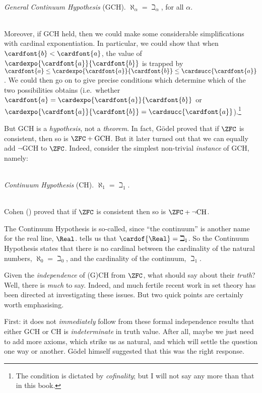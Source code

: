 \documentclass[../../../include/open-logic-section]{subfiles}
\begin{document}
\
\\\emph{General Continuum Hypothesis} (GCH). $\aleph_\alpha  = \beth_\alpha$, for all $\alpha$. 

\
\\Moreover, if GCH held, then we could make some considerable simplifications with cardinal exponentiation. In particular, we could show that when $\cardfont{b} < \cardfont{a}$, the value of $\cardexpo{\cardfont{a}}{\cardfont{b}}$ is trapped by $\cardfont{a}\leq \cardexpo{\cardfont{a}}{\cardfont{b}} \leq \cardsucc{\cardfont{a}}$. We could then go on to give precise conditions which determine which of the two possibilities obtains (i.e.\ whether $\cardfont{a} = \cardexpo{\cardfont{a}}{\cardfont{b}}$ or $\cardexpo{\cardfont{a}}{\cardfont{b}} = \cardsucc{\cardfont{a}}$).\footnote{The condition is dictated by \emph{cofinality}; but I will not say any more than that in this book.}

But GCH is a \emph{hypothesis}, not a \emph{theorem}. In fact, G\"odel \citeyear{Godel1938} proved that if $\ZFC$ is consistent, then so is $\ZFC + \text{GCH}$. But it later turned out that we can equally add $\lnot$GCH to $\ZFC$. Indeed, consider the simplest non-trivial \emph{instance} of GCH, namely: 

\
\\\emph{Continuum Hypothesis} (CH). $\aleph_1 = \beth_1$. 

\
\\
Cohen (\citeyear{Cohen1963}) proved that if $\ZFC$ is consistent then so is $\ZFC + \lnot\text{CH}$. 

The Continuum Hypothesis is so-called, since ``the continuum'' is another name for the real line, $\Real$.   tells us that $\cardof{\Real} = \beth_1$. So the Continuum Hypothesis states that there is no cardinal between the cardinality of the natural numbers, $\aleph_0 = \beth_0$, and the cardinality of the continuum, $\beth_1$. 

Given the \emph{independence} of (G)CH from $\ZFC$, what should say about their \emph{truth}? Well, there is \emph{much} to say. Indeed, and much fertile recent work in set theory has been directed at investigating these issues. But two quick points are certainly worth emphasising. 

First: it does not \emph{immediately} follow from these formal independence results that either GCH or CH is \emph{indeterminate} in truth value. After all, maybe we just need to add more axioms, which strike us as natural, and which will settle the question one way or another. G\"odel himself suggested that this was the right response. 
\end{document}
